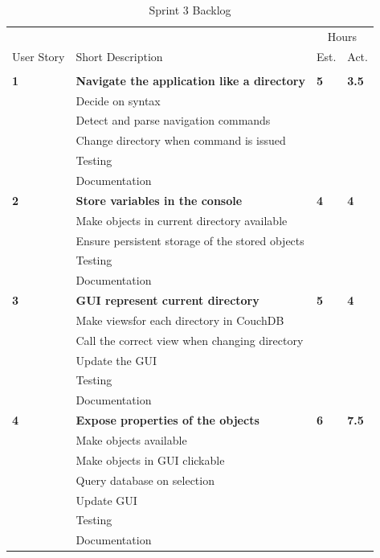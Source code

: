 \begin{table}
\caption{Sprint 3 Backlog}
\centering
\begin{tabular}{ l p{8cm} l l }
\hline 
			&				&\multicolumn{2}{c}{Hours}			\\
 User Story	& Short Description		&Est.		&Act.	                               \\ 
\hline \\ [-2.0ex]
 
\bf{1}     &\bf{Navigate the application like a directory}		&\bf{5}		&\bf{3.5}          \\ 
		  &Decide on syntax						&			&		\\
		  &Detect and parse navigation commands	&			&		\\
		  &Change directory when command is issued&			&		\\
		  &Testing							&			&		\\
		  &Documentation						&			&		\\

 \bf{2}     &\bf{Store variables in the console} 				&\bf{4}		&\bf{4}               \\ 
		  &Make objects in current directory available		&			&		\\
		  &Ensure persistent storage of the stored objects	&			&		\\
		  &Testing								&			&		\\
		  &Documentation							&			&		\\

 \bf{3}     &\bf{GUI represent current directory} 			&\bf{5}		&\bf{4}		     \\ 
		  &Make viewsfor each directory in CouchDB		&			&		\\
		  &Call the correct view when changing directory	&			&		\\
		  &Update the GUI							&			&		\\
		  &Testing								&			&		\\
		  &Documentation							&			&		\\

 \bf{4}   	&\bf{Expose properties of the objects}			&\bf{6}		&\bf{7.5}		     \\ 
		  &Make objects available						&			&		\\
		  &Make objects in GUI clickable				&			&		\\
		  &Query database on selection				&			&		\\
		  &Update GUI								&			&		\\
		  &Testing								&			&		\\
		  &Documentation							&			&		\\


\end{tabular}
\end{table}
